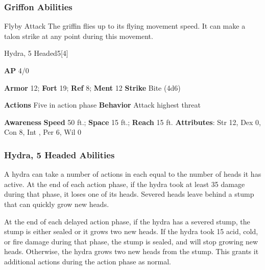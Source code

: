\subsubsection{Griffon Abilities}

\begin{freeability}{Flyby Attack}
The griffin flies up to its flying movement speed.
It can make a talon strike at any point during this movement.
\end{freeability}

\begin{monsection}{Hydra, 5 Headed}{5}[4]
\vspace{-1em}\vspace{-1em}
\begin{spellcontent}
\begin{spelltargetinginfo}
{\textbf{AP} 4/0}

\pari \textbf{Armor} 12;
\textbf{Fort} 19;
\textbf{Ref} 8;
\textbf{Ment} 12
\pari \textbf{Strike} Bite  (4d6)


\pari \textbf{Actions} Five in action phase
\pari \textbf{Behavior} Attack highest threat
\end{spelltargetinginfo}
\end{spellcontent}

\begin{monsterfooter}
\pari \textbf{Awareness} 
\pari \textbf{Speed} 50 ft.;
\textbf{Space} 15 ft.;
\textbf{Reach} 15 ft.
\pari \textbf{Attributes}:
Str 12,
Dex 0,
Con 8,
Int ,
Per 6,
Wil 0
\end{monsterfooter}
\end{monsection}


\subsubsection{Hydra, 5 Headed Abilities}

A hydra can take a number of actions in each  equal to the number of heads it has active.
At the end of each action phase, if the hydra took at least 35 damage during that phase, it loses one of its heads.
Severed heads leave behind a stump that can quickly grow new heads.

At the end of each delayed action phase, if the hydra has a severed stump, the stump is either sealed or it grows two new heads.
If the hydra took 15 acid, cold, or fire damage during that phase, the stump is sealed, and will stop growing new heads.
Otherwise, the hydra grows two new heads from the stump.
This grants it additional actions during the action phase as normal.

